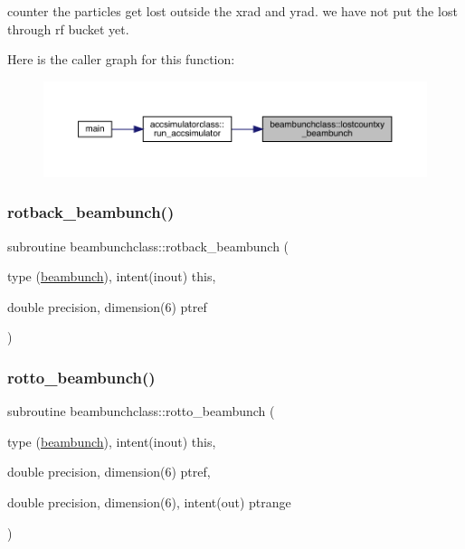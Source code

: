 counter the particles get lost outside the xrad and yrad. we have not put the lost through rf bucket yet. 

Here is the caller graph for this function\+:\nopagebreak
\begin{figure}[H]
\begin{center}
\leavevmode
\includegraphics[width=350pt]{namespacebeambunchclass_a54a4d80405bb8fbde341ea9e46a224e4_icgraph}
\end{center}
\end{figure}
\mbox{\label{namespacebeambunchclass_a3b4334f47908375d6a6dc12f1509397c}} 
\subsubsection{\texorpdfstring{rotback\_beambunch()}{rotback\_beambunch()}}
{\footnotesize\ttfamily subroutine beambunchclass\+::rotback\+\_\+beambunch (\begin{DoxyParamCaption}\item[{type (\mbox{\hyperlink{namespacebeambunchclass_structbeambunchclass_1_1beambunch}{beambunch}}), intent(inout)}]{this,  }\item[{double precision, dimension(6)}]{ptref }\end{DoxyParamCaption})}

\mbox{\label{namespacebeambunchclass_a05e93a990ca0c8071c035d078ffb7bb0}} 
\subsubsection{\texorpdfstring{rotto\_beambunch()}{rotto\_beambunch()}}
{\footnotesize\ttfamily subroutine beambunchclass\+::rotto\+\_\+beambunch (\begin{DoxyParamCaption}\item[{type (\mbox{\hyperlink{namespacebeambunchclass_structbeambunchclass_1_1beambunch}{beambunch}}), intent(inout)}]{this,  }\item[{double precision, dimension(6)}]{ptref,  }\item[{double precision, dimension(6), intent(out)}]{ptrange }\end{DoxyParamCaption})}



